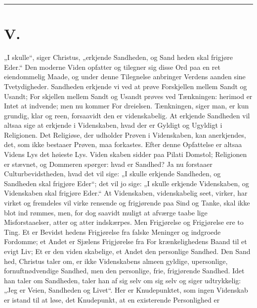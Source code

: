 \documentclass[12pt]{book}
\newcommand{\opage}[1]{\marginnote{\footnotesize\textit{[#1]}}}
\begin{document}
\begin{center}\rule{3cm}{0.4pt}\end{center}

\chapter*{V.}
\label{ch:v}
\opage{73}\setcounter{footnote}{0}%
„I skulle“, siger Christus, „erkjende Sandheden, og Sand\-%
heden skal frigjøre Eder.“ Den moderne Viden
opfatter og tilegner sig disse Ord paa en ret eiendommelig
Maade, og under denne Tilegnelse anbringer Verdens\-%
aanden sine Tvetydigheder. Sandheden erkjende vi ved
at prøve Forskjellen mellem Sandt og Usandt; For\-%
skjellen mellem Sandt og Usandt prøves ved Tænkningen:
herimod er Intet at indvende; men nu kommer For\-%
dreielsen. Tænkningen, siger man, er kun grundig, klar
og reen, forsaavidt den er videnskabelig. At erkjende
Sandheden vil altsaa sige at erkjende i Videnskaben, hvad
der er Gyldigt og Ugyldigt i Religionen. Det Religiøse,
der udholder Prøven i Videnskaben, kan anerkjendes,
det, som ikke bestaaer Prøven, maa forkastes. Efter denne
Opfattelse er altsaa Videns Lys det høieste Lys. Viden\-%
skaben sidder paa Pilati Domstol; Religionen er stævnet,
og Dommeren spørger: hvad er Sandhed? Ja nu forstaaer
Culturbevidstheden, hvad det vil sige: „I skulle erkjende
Sandheden, og Sandheden skal frigjøre Eder“; det vil
jo sige: „I skulle erkjende Videnskaben, og Videnskaben
skal frigjøre Eder.“ At Videnskaben, videnskabelig
seet, virker, har virket og fremdeles vil virke rensende
og frigjørende paa Sind og Tanke, skal ikke blot ind\-%
\opage{74}\setcounter{footnote}{0}%
rømmes, men, for dog saavidt muligt at afværge taabe\-%
lige Misforstaaelser, atter og atter indskærpes. Men
Frigjørelse og Frigjørelse ere to Ting. Et er Bevidst\-%
hedens Frigjørelse fra falske Meninger og indgroede
Fordomme; et Andet er Sjælens Frigjørelse fra For\-%
krænkelighedens Baand til et evigt Liv; Et er den viden\-%
skabelige, et Andet den personlige Sandhed. Den Sand\-%
hed, Christus taler om, er ikke Videnskabens almeen\-%
gyldige, upersonlige, fornuftnødvendige Sandhed, men den
personlige, frie, frigjørende Sandhed. Idet han taler om
Sandheden, taler han af sig selv om sig selv og siger
udtrykkelig: „Jeg er Veien, Sandheden og Livet“. Her
er Knudepunktet, som ingen Videnskab er istand til at
løse, det Knudepunkt, at en existerende Personlighed er
\end{document}
